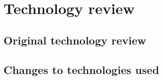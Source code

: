 \section{Technology review}

\subsection{Original technology review}

\subsection{Changes to technologies used}
